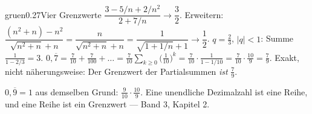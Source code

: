 \begin{loesungkarte}{gruen}{0.27}{Vier Grenzwerte}
$\dfrac{3 - 5/n + 2/n^{2}}{2 + 7/n}\to\dfrac32$.
Erweitern: $\dfrac{(n^{2} + n) - n^{2}}{\sqrt{n^{2} + n} + n} = \dfrac{n}{\sqrt{n^{2} + n} + n} = \dfrac{1}{\sqrt{1 + 1/n} + 1}\to\dfrac12$.
$q = \frac23$, $|q| < 1$: Summe $\frac1{1 - 2/3} = 3$.
$0{,}\overline7 = \frac7{10} + \frac7{100} + \dots = \frac7{10}\sum_{k\ge0}\bigl(\frac1{10}\bigr)^{k} = \frac7{10}\cdot\frac{1}{1 - 1/10} = \frac7{10}\cdot\frac{10}9 = \frac79$. Exakt, nicht näherungsweise: Der Grenzwert der Partialsummen \emph{ist} $\frac79$.
\begin{mitnehmen}\kastentext
$0{,}\overline9 = 1$ aus demselben Grund: $\frac9{10}\cdot\frac{10}9$. Eine unendliche Dezimalzahl ist eine Reihe, und eine Reihe ist ein Grenzwert --- Band 3, Kapitel 2.
\end{mitnehmen}
\end{loesungkarte}

